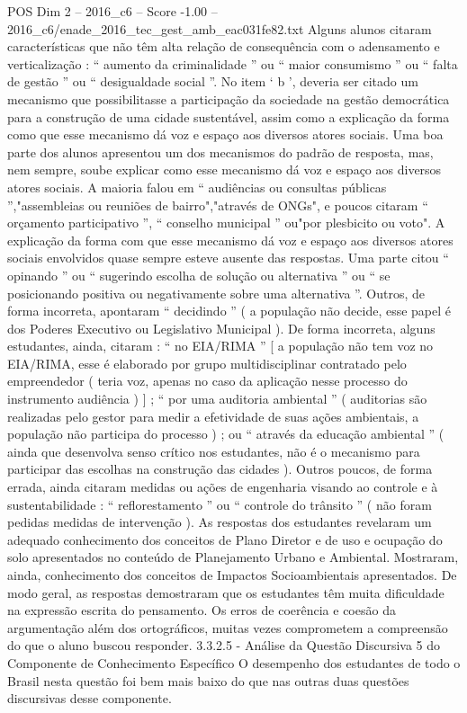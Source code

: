 \begin{textsample}{POS Dim 2 – 2016\_c6 – Score -1.00 – 2016\_c6/enade\_2016\_tec\_gest\_amb\_eac031fe82.txt}
Alguns alunos citaram características que não têm alta relação de consequência com o adensamento e verticalização : “ aumento da criminalidade ” ou “ maior consumismo ” ou “ falta de gestão ” ou “ desigualdade social ”.
No item ‘ b ’, deveria ser citado um mecanismo que possibilitasse a participação da sociedade na gestão democrática para a construção de uma cidade sustentável, assim como a explicação da forma como que esse mecanismo dá voz e espaço aos diversos atores sociais.
Uma boa parte dos alunos apresentou um dos mecanismos do padrão de resposta, mas, nem sempre, soube explicar como esse mecanismo dá voz e espaço aos diversos atores sociais.
A maioria falou em “ audiências ou consultas públicas ”,"assembleias ou reuniões de bairro","através de ONGs", e poucos citaram “ orçamento participativo ”, “ conselho municipal ” ou"por plesbicito ou voto".
A explicação da forma com que esse mecanismo dá voz e espaço aos diversos atores sociais envolvidos quase sempre esteve ausente das respostas.
Uma parte citou “ opinando ” ou “ sugerindo escolha de solução ou alternativa ” ou “ se posicionando positiva ou negativamente sobre uma alternativa ”.
Outros, de forma incorreta, apontaram “ decidindo ” ( a população não decide, esse papel é dos Poderes Executivo ou Legislativo Municipal ).
De forma incorreta, alguns estudantes, ainda, citaram : “ no EIA/RIMA ” [ a população não tem voz no EIA/RIMA, esse é elaborado por grupo multidisciplinar contratado pelo empreendedor ( teria voz, apenas no caso da aplicação nesse processo do instrumento audiência ) ] ; “ por uma auditoria ambiental ” ( auditorias são realizadas pelo gestor para medir a efetividade de suas ações ambientais, a população não participa do processo ) ; ou “ através da educação ambiental ” ( ainda que desenvolva senso crítico nos estudantes, não é o mecanismo para participar das escolhas na construção das cidades ).
Outros poucos, de forma errada, ainda citaram medidas ou ações de engenharia visando ao controle e à sustentabilidade : “ reflorestamento ” ou “ controle do trânsito ” ( não foram pedidas medidas de intervenção ).
As respostas dos estudantes revelaram um adequado conhecimento dos conceitos de Plano Diretor e de uso e ocupação do solo apresentados no conteúdo de Planejamento Urbano e Ambiental.
Mostraram, ainda, conhecimento dos conceitos de Impactos Socioambientais apresentados.
De modo geral, as respostas demostraram que os estudantes têm muita dificuldade na expressão escrita do pensamento.
Os erros de coerência e coesão da argumentação além dos ortográficos, muitas vezes comprometem a compreensão do que o aluno buscou responder. 3.3.2.5 - Análise da Questão Discursiva 5 do Componente de Conhecimento Específico O desempenho dos estudantes de todo o Brasil nesta questão foi bem mais baixo do que nas outras duas questões discursivas desse componente.

\end{textsample}
